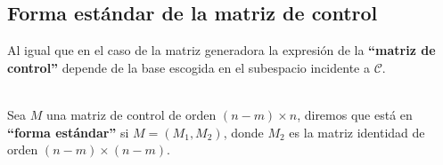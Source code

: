 \subsection{Forma est\'andar de la matriz de control}

Al igual que en el caso de la matriz generadora la expresi\'on de la 
\textbf{``matriz de control''} depende de la base escogida en el subespacio
incidente a $\mathcal{C}$.

\begin{definicion}
\ \\
Sea $M$ una matriz de control de orden $(n-m)\times n$, diremos que est\'a en
\textbf{``forma est\'andar''} si $M=(M_1,M_2)$, donde $M_2$ es la matriz
identidad de orden $(n-m)\times (n-m)$.
\end{definicion}
